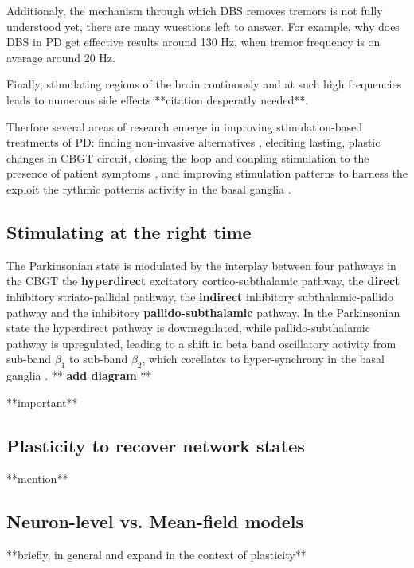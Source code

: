 Additionaly, the mechanism through which DBS removes tremors is not fully understood yet, there
are many wuestions left to answer. For example, why does DBS in PD get effective results around
130 Hz, when tremor frequency is on average around 20 Hz.

Finally, stimulating regions of the brain continously and at such high frequencies leads to
numerous side effects **citation desperatly needed**.

Therfore several areas of research emerge in improving stimulation-based treatments of PD:
finding non-invasive alternatives \cite{saturnino2017target, schwab2020spike}, eleciting lasting,
plastic changes in CBGT circuit, closing the loop and coupling stimulation to the presence of
patient symptoms \cite{beudel2018adaptive}, and improving stimulation patterns to harness the
exploit the rythmic patterns activity in the basal ganglia \cite{cagnan2017stimulating, west2022stimulating}.

\subsection{Stimulating at the right time}
The Parkinsonian state is modulated by the interplay between four pathways in the CBGT
the \textbf{hyperdirect} excitatory cortico-subthalamic pathway,
the \textbf{direct} inhibitory striato-pallidal pathway,
the \textbf{indirect} inhibitory subthalamic-pallido pathway and
the inhibitory \textbf{pallido-subthalamic} pathway. In the Parkinsonian state the hyperdirect
pathway is downregulated, while pallido-subthalamic pathway is upregulated, leading to a shift in
beta band oscillatory activity from sub-band $\beta_1$ to sub-band $\beta_2$, which corellates to
hyper-synchrony in the basal ganglia \cite{west2022stimulating}.
** \textbf{add diagram} **

**important** \cite{cagnan2017stimulating} \cite{beudel2018adaptive} \cite{west2022stimulating}

\subsection{Plasticity to recover network states}
**mention** \cite{lebedev2017brain} \cite{cramer2011harnessing}

\subsection{Neuron-level vs. Mean-field models}
**briefly, in general and expand in the context of plasticity**

